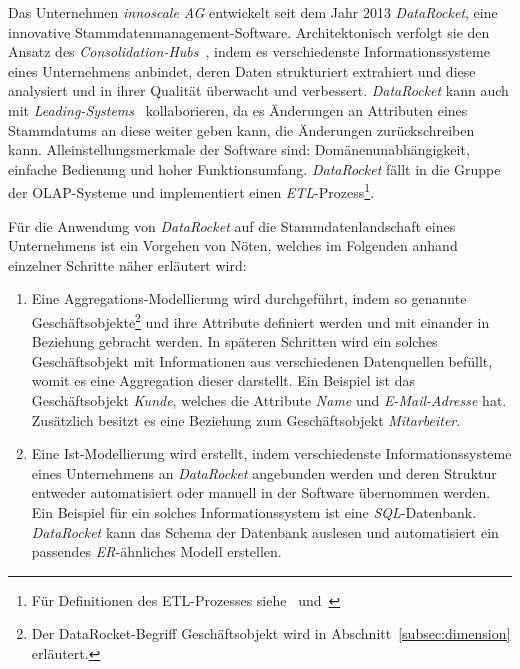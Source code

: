 \documentclass[
  language=german, %
  type=bachelor,%
  ngerman
]{isthesis}
\begin{document}
\begin{content}
	Das Unternehmen \textit{innoscale AG} entwickelt seit dem Jahr 2013
	\textit{DataRocket}, eine innovative Stammdatenmanagement-Software.
	Architektonisch verfolgt sie den Ansatz des
	\textit{Consolidation-Hubs}~\cite[][]{baghi2014toward}, indem es
	verschiedenste Informationssysteme eines Unternehmens anbindet, deren Daten
	strukturiert extrahiert und diese analysiert und in ihrer Qualität überwacht
	und verbessert. \textit{DataRocket} kann auch mit
	\textit{Leading-Systems}~\cite[][]{baghi2014toward} kollaborieren, da es
	Änderungen an Attributen eines Stammdatums an diese weiter geben kann, \bzw{}
	die Änderungen zurückschreiben kann.  Alleinstellungsmerkmale der Software
	sind: Domänenunabhängigkeit, einfache Bedienung und hoher
	Funktionsumfang.
	\textit{DataRocket} fällt in die Gruppe der \acrshort{OLAP}-Systeme und
	implementiert einen \textit{\acrlong{ETL}}-Prozess\footnote{Für Definitionen
	des ETL-Prozesses siehe~\textsc{\citeauthor{vassiliadis2002conceptual}}
	\citeyearpar{vassiliadis2002conceptual}
	und~\textsc{\citeauthor{trujillo2003uml}}}.

  Für die Anwendung von \textit{DataRocket} auf die Stammdatenlandschaft eines
  Unternehmens ist ein Vorgehen von Nöten, welches im Folgenden anhand
  einzelner Schritte näher erläutert wird:

	\begin{enumerate}
		\item Eine Aggregations-Modellierung wird durchgeführt, indem so genannte
		Geschäftsobjekte\footnote{Der DataRocket-Begriff Geschäftsobjekt wird in
		Abschnitt~\ref{subsec:dimension} erläutert.} und ihre Attribute definiert
		werden und mit einander in Beziehung gebracht werden. In späteren Schritten
		wird ein solches Geschäftsobjekt mit Informationen aus verschiedenen
		Datenquellen befüllt, womit es eine Aggregation dieser darstellt. Ein
		Beispiel ist das Geschäftsobjekt \textit{Kunde}, welches die Attribute
		\textit{Name} und \textit{E-Mail-Adresse} hat. Zusätzlich besitzt es eine
		Beziehung zum Geschäftsobjekt \textit{Mitarbeiter}. 

    \item Eine Ist-Modellierung wird erstellt, indem verschiedenste
      Informationssysteme eines Unternehmens an \textit{DataRocket} angebunden
      werden und deren Struktur entweder automatisiert oder manuell in der
			Software übernommen werden. Ein Beispiel für ein solches
			Informationssystem ist eine \textit{SQL}-Datenbank. \textit{DataRocket}
			kann das Schema der Datenbank auslesen und automatisiert ein passendes
			\textit{\acrshort{ER}}-ähnliches Modell erstellen.


\end{enumerate}
\end{content}
\end{document}

